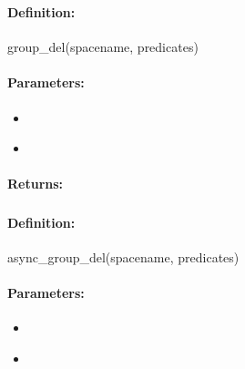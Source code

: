 \pagebreak
\subsubsection{}
\label{api:ruby:group_del}


\paragraph{Definition:}
\begin{rubycode}
group_del(spacename, predicates)
\end{rubycode}

\paragraph{Parameters:}
\begin{itemize}[noitemsep]
\item {}\\

\item {}\\

\end{itemize}

\paragraph{Returns:}


\pagebreak
\subsubsection{}
\label{api:ruby:async_group_del}


\paragraph{Definition:}
\begin{rubycode}
async_group_del(spacename, predicates)
\end{rubycode}

\paragraph{Parameters:}
\begin{itemize}[noitemsep]
\item {}\\

\item {}\\

\end{itemize}

